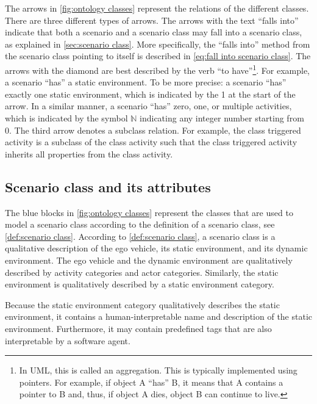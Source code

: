 The arrows in \cref{fig:ontology classes} represent the relations of the different classes. There are three different types of arrows. The arrows with the text ``falls into'' indicate that both a scenario and a scenario class may fall into a scenario class, as explained in \cref{sec:scenario class}. More specifically, the ``falls into'' method from the scenario class pointing to itself is described in \cref{eq:fall into scenario class}. The arrows with the diamond are best described by the verb ``to have''\footnote{In UML, this is called an aggregation. \cbstartb This is typically implemented using pointers. For example, if object A ``has'' B, it means that A contains a pointer to B and, thus, if object A dies, object B can continue to live.\cbend}. For example, a scenario ``has'' a static environment. To be more precise: a scenario ``has'' exactly one static environment, which is indicated by the 1 at the start of the arrow. In a similar manner, a scenario ``has'' zero, one, or multiple activities, which is indicated by the symbol $\mathbb{N}$ indicating any integer number starting from 0. The third arrow denotes a subclass relation. For example, the class triggered activity is a subclass of the class activity such that the class triggered activity inherits all properties from the class activity.



\subsection{Scenario class and its attributes}
\label{sec:domain scenario class}

The blue blocks in \cref{fig:ontology classes} represent the classes that are used to model a scenario class according to the definition of a scenario class, see \cref{def:scenario class}. According to \cref{def:scenario class}, a scenario class is a qualitative description of the ego vehicle, its static environment, and its dynamic environment. The ego vehicle and the dynamic environment are qualitatively described by activity categories and actor categories. Similarly, the static environment is qualitatively described by a static environment category. 

\cbstartc
Because the static environment category qualitatively describes the static environment, it contains a human-interpretable name and description of the static environment. Furthermore, it may contain predefined tags that are also interpretable by a software agent.
\cbend

